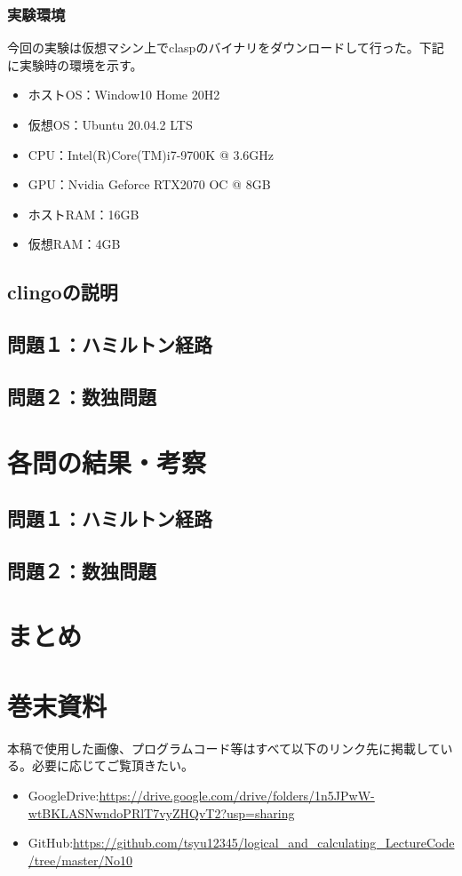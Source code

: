 \documentclass[dvipdfmx]{jsarticle}
\begin{document}
  \subsubsection{実験環境}
  今回の実験は仮想マシン上でclaspのバイナリをダウンロードして行った。下記に実験時の環境を示す。
  \begin{itemize}
    \item ホストOS：Window10 Home 20H2
    \item 仮想OS：Ubuntu 20.04.2 LTS
    \item CPU：Intel(R)Core(TM)i7-9700K @ 3.6GHz
    \item GPU：Nvidia Geforce RTX2070 OC @ 8GB
    \item ホストRAM：16GB
    \item 仮想RAM：4GB
  \end{itemize}
\subsection{clingoの説明}
\subsection{問題１：ハミルトン経路}
\subsection{問題２：数独問題}

\section{各問の結果・考察}
\subsection{問題１：ハミルトン経路}
\subsection{問題２：数独問題}

\section{まとめ}
\section{巻末資料}
本稿で使用した画像、プログラムコード等はすべて以下のリンク先に掲載している。必要に応じてご覧頂きたい。
\begin{itemize}
  \item GoogleDrive:\url{https://drive.google.com/drive/folders/1n5JPwW-wtBKLASNwndoPRlT7vyZHQvT2?usp=sharing}
  \item GitHub:\url{https://github.com/tsyu12345/logical_and_calculating_LectureCode/tree/master/No10}
\end{itemize}
\end{document}
